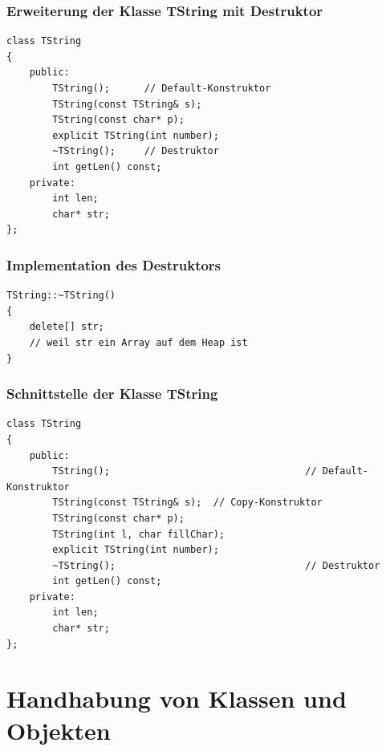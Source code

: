 \begin{multicols}{2}
\subsubsection{Erweiterung der Klasse TString mit Destruktor}
\vspace{-\baselineskip}
\begin{minipage}{\linewidth}
\begin{lstlisting}
class TString
{
	public:
		TString();		// Default-Konstruktor
		TString(const TString& s);
		TString(const char* p);
		explicit TString(int number);
		~TString();		// Destruktor
		int getLen() const;
	private:
		int len;
		char* str;
};
\end{lstlisting}
\end{minipage}
\vfill\null
\columnbreak
\subsubsection{Implementation des Destruktors}
\begin{minipage}{\linewidth}
\begin{lstlisting}
TString::~TString()
{
	delete[] str;
	// weil str ein Array auf dem Heap ist
}
\end{lstlisting}
\end{minipage}
\end{multicols}

\subsubsection{Schnittstelle der Klasse TString}
\vspace{-\baselineskip}
\begin{minipage}{0.7\linewidth}
\begin{lstlisting}
class TString
{
	public:
		TString();									// Default-Konstruktor
		TString(const TString& s);	// Copy-Konstruktor
		TString(const char* p);
		TString(int l, char fillChar);
		explicit TString(int number);
		~TString();									// Destruktor
		int getLen() const;
	private:
		int len;
		char* str;
};
\end{lstlisting}
\end{minipage}
\clearpage\pagebreak

\section{Handhabung von Klassen und Objekten}

